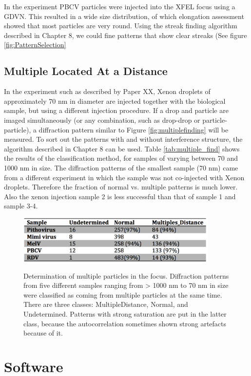In the experiment PBCV particles were injected into the XFEL focus using a GDVN. This resulted in a wide size distribution, of which elongation assessment showed that most particles are very round. Using the streak finding algorithm described in Chapter 8, we could fine patterns that show clear streaks (See figure \ref{fig:PatternSelection}


\subsection{Multiple Located At a Distance}

In the experiment such as described by Paper XX, Xenon droplets of approximately 70 nm in diameter are injected together with the biological sample, but using a different injection procedure. If a drop and particle are imaged simultaneously (or any combination, such as drop-drop or particle-particle), a diffraction pattern similar to Figure \ref{fig:multiplefinding} will be measured. To sort out the patterns with and without interference structure, the algorithm described in Chapter 8 can be used. Table \ref{tab:multiple_find} shows the results of the classification method, for samples of varying between 70 and 1000 nm in size. The diffraction patterns of the smallest sample (70 nm) came from a different experiment in which the sample was not co-injected with Xenon droplets. Therefore the fraction of normal vs. multiple patterns is much lower. Also the xenon injection sample 2 is less successful than that of sample 1 and sample 3-4.

\begin{figure}[h]
\centering
\includegraphics[width=100mm]{Chapter_09_Results_successrate.png}
\label{fig:Classes}
\caption{Determination of multiple particles in the focus. Diffraction patterns from five different samples ranging from > 1000 nm to 70 nm in size were classified as coming from multiple particles at the same time. There are three classes: MultipleDistance, Normal, and Undetermined. Patterns with strong saturation are put in the latter class, because the autocorrelation sometimes shown strong artefacts because of it. }

\end{figure}

\section{Software}

